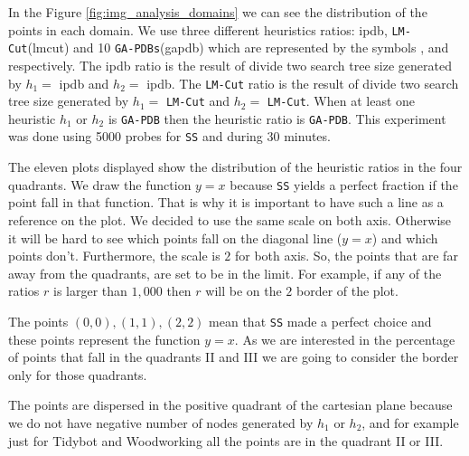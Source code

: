 In the Figure \ref{fig:img_analysis_domains} we can see the distribution of the points in each domain. We use three different heuristics ratios: ipdb, \texttt{LM-Cut}(lmcut) and 10 \texttt{GA-PDBs}(gapdb) which are represented by the symbols  ,  and  respectively. The ipdb ratio is the result of divide two search tree size generated by $h_{1} =$ ipdb and $h_{2} =$ ipdb. The \texttt{LM-Cut} ratio is the result of divide two search tree size generated by $h_{1} =$ \texttt{LM-Cut} and $h_{2} =$  \texttt{LM-Cut}. When at least one heuristic $h_{1}$ or $h_{2}$ is \texttt{GA-PDB} then the heuristic ratio is \texttt{GA-PDB}. This experiment was done using 5000 probes for \texttt{SS} and during 30 minutes.

The eleven plots displayed show  the distribution of the heuristic ratios in the four quadrants. We draw the function $y = x$ because \texttt{SS} yields a perfect fraction if the point fall in that function. That is why it is important to have such a line as a reference on the plot. We decided to use the same scale on both axis. Otherwise it will be hard to see which points fall on the diagonal line ($y = x$) and which points don't. Furthermore, the scale is $2$ for both axis. So, the points that are far away from the quadrants, are set to be in the limit. For example, if any of the ratios $r$ is larger than $1,000$ then $r$ will be on the $2$ border of the plot.

The points $(0,0), (1,1), (2,2)$ mean that \texttt{SS} made a perfect choice and these points represent the function $y = x$. As we are interested in the percentage of points that fall in the quadrants II and III we are going to consider the border only for those quadrants.

The points are dispersed in the positive quadrant of the cartesian plane because we do not have negative number of nodes generated by $h_{1}$ or $h_{2}$, and for example just for Tidybot and Woodworking all the points are in the quadrant II or III.

